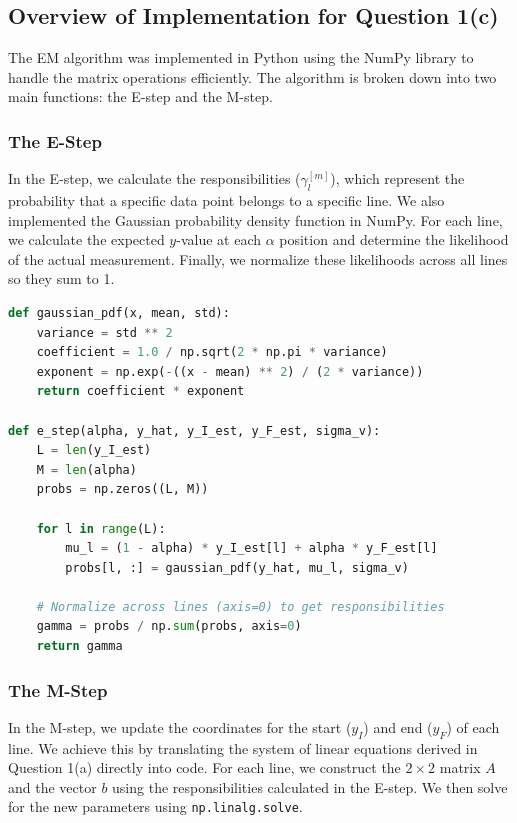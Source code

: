 \documentclass{article}
\begin{document}
\subsection{Overview of Implementation for Question 1(c)}

The EM algorithm was implemented in Python using the NumPy library to handle the matrix operations efficiently. The algorithm is broken down into two main functions: the E-step and the M-step.

\subsubsection*{The E-Step}
In the E-step, we calculate the responsibilities ($\gamma_l^{[m]}$), which represent the probability that a specific data point belongs to a specific line. We also implemented the Gaussian probability density function in NumPy. For each line, we calculate the expected $y$-value at each $\alpha$ position and determine the likelihood of the actual measurement. Finally, we normalize these likelihoods across all lines so they sum to 1.

\begin{lstlisting}[language=Python]
def gaussian_pdf(x, mean, std):
    variance = std ** 2
    coefficient = 1.0 / np.sqrt(2 * np.pi * variance)
    exponent = np.exp(-((x - mean) ** 2) / (2 * variance))
    return coefficient * exponent

def e_step(alpha, y_hat, y_I_est, y_F_est, sigma_v):
    L = len(y_I_est)
    M = len(alpha)
    probs = np.zeros((L, M))
    
    for l in range(L):
        mu_l = (1 - alpha) * y_I_est[l] + alpha * y_F_est[l]
        probs[l, :] = gaussian_pdf(y_hat, mu_l, sigma_v)
        
    # Normalize across lines (axis=0) to get responsibilities
    gamma = probs / np.sum(probs, axis=0)
    return gamma
\end{lstlisting}

\subsubsection*{The M-Step}
In the M-step, we update the coordinates for the start ($y_I$) and end ($y_F$) of each line. We achieve this by translating the system of linear equations derived in Question 1(a) directly into code. For each line, we construct the $2 \times 2$ matrix $A$ and the vector $b$ using the responsibilities calculated in the E-step. We then solve for the new parameters using \texttt{np.linalg.solve}.
\end{document}
